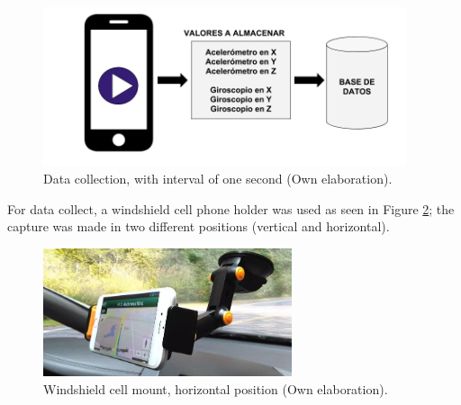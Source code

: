 \vspace{5mm} %

\begin{figure}[h!]
  \begin{center}	\includegraphics[width=0.95\textwidth,frame]{imagenes/Cap3/captura}
  \caption{Data collection, with interval of one second (Own elaboration).}
  \label{fig:captura}
  \end{center}
\end{figure}

\vspace{5mm} %

For data collect, a windshield cell phone holder was used as seen in Figure \ref{fig:soporte}; the capture was made in two different positions (vertical and horizontal).
\vspace{5mm} %

\begin{figure}[h!]
  \begin{center}	\includegraphics[width=0.65\textwidth,frame]{imagenes/Cap3/soporte}
  \caption{Windshield cell mount, horizontal position (Own elaboration).}
  \label{fig:soporte}
  \end{center}
\end{figure}

